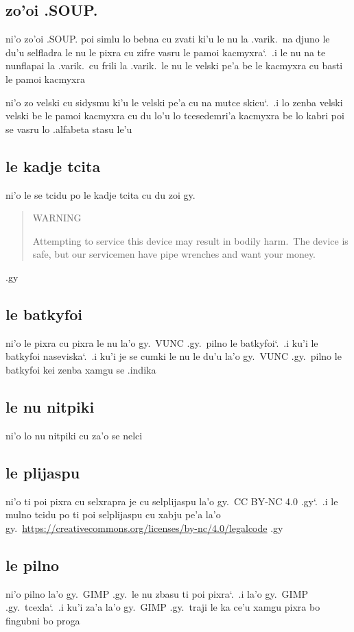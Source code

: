 \documentclass{report}
\newcommand\sds{\spacefactor\sfcode`.\ \space}
\begin{document}
\subsection{zo'oi .SOUP.}
ni'o zo'oi .SOUP. poi simlu lo bebna cu zvati ki'u le nu la .varik.\ na djuno le du'u selfladra le nu le pixra cu zifre vasru le pamoi kacmyxra\sds  .i le nu na te nunflapai la .varik.\ cu frili la .varik.\ le nu le velski pe'a be le kacmyxra cu basti le pamoi kacmyxra

ni'o zo velski cu sidysmu ki'u le velski pe'a cu na mutce skicu\sds  .i lo zenba velski velski be le pamoi kacmyxra cu du lo'u lo tcesedemri'a kacmyxra be lo kabri poi se vasru lo .alfabeta stasu le'u

\subsection{le kadje tcita}
ni'o le se tcidu po le kadje tcita cu du zoi gy.
\begin{quote}
	WARNING

	Attempting to service this device may result in bodily harm.\  The device is safe, but our servicemen have pipe wrenches and want your money.
\end{quote}
.gy

\subsection{le batkyfoi}
ni'o le pixra cu pixra le nu la'o gy.\ VUNC .gy.\ pilno le batkyfoi\sds  .i ku'i le batkyfoi naseviska\sds  .i ku'i je se cumki le nu le du'u la'o gy.\ VUNC .gy.\ pilno le batkyfoi kei zenba xamgu se .indika

\subsection{le nu nitpiki}
ni'o lo nu nitpiki cu za'o se nelci

\subsection{le plijaspu}
ni'o ti poi pixra cu selxrapra je cu selplijaspu la'o gy.\ CC BY-NC 4.0 .gy\sds .i le mulno tcidu po ti poi selplijaspu cu xabju pe'a la'o gy.\ \url{https://creativecommons.org/licenses/by-nc/4.0/legalcode} .gy

\subsection{le pilno}
ni'o pilno la'o gy.\ GIMP .gy.\ le nu zbasu ti poi pixra\sds  .i la'o gy.\ GIMP .gy.\ tcexla\sds  .i ku'i za'a la'o gy.\ GIMP .gy.\ traji le ka ce'u xamgu pixra bo fingubni bo proga
\end{document}
